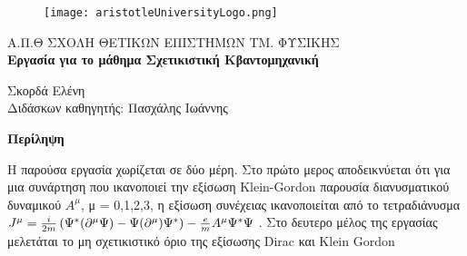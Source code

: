 \documentclass[12pt,oneside,titlepage,a4paper]{article}
\newcommand{\rbr}{
  \ensuremath{\right) }
}
\newcommand{\lbr}{
  \ensuremath{\left( }
}
\renewenvironment{abstract}[1][1.0]
{
	\begin{center}
		{\bf Περίληψη}\\[12pt]
		\begin{minipage}{#1\textwidth}
}
{
		\end{minipage}
	\end{center}
}
\begin{document}

\begin{titlepage}
	\begin{figure}[H]
		\centering
		\texttt{[image: aristotleUniversityLogo.png]}
	\end{figure}
	
	\begin{center}
		\large{{\sc Α.Π.Θ} ΣΧΟΛΗ ΘΕΤΙΚΩΝ ΕΠΙΣΤΗΜΩΝ ΤΜ. ΦΥΣΙΚΗΣ}\\[0.5cm]
		\LARGE\textbf{Εργασία για το μάθημα Σχετικιστική Κβαντομηχανική}\\[1.0cm] 

		\vspace{0.0cm}

		\small{Σκορδά Ελένη}\\[0.2cm]
               
		\small{Διδάσκων καθηγητής: Πασχάλης Ιωάννης }\\[0.2cm]

	\end{center}

	\begin{abstract}
	  Η παρούσα εργασία χωρίζεται σε δύο μέρη. Στο πρώτο μερος αποδεικνύεται ότι για μια συνάρτηση που ικανοποιεί την εξίσωση \textlatin{Klein-Gordon} παρουσία διανυσματικού δυναμικού $A^\mu$, μ = 0,1,2,3, η εξίσωση συνέχειας ικανοποιείται από το τετραδιάνυσμα $J^\mu =\frac{i}{2m} \lbr \Psi^* (\partial^\mu \Psi)-\Psi(\partial^\mu)\Psi^* \rbr - \frac{e}{m}A^\mu \Psi^* \Psi$ . Στο δευτερο μέλος της εργασίας μελετάται το μη σχετικιστικό όριο της εξίσωσης \textlatin{Dirac} και \textlatin{Klein Gordon}  
          
	\end{abstract}
        
	\vfill

\end{titlepage}

\newpage


\tableofcontents
\newpage



\pagebreak

\pagebreak

\pagebreak

\pagebreak

\pagebreak
\end{document}
